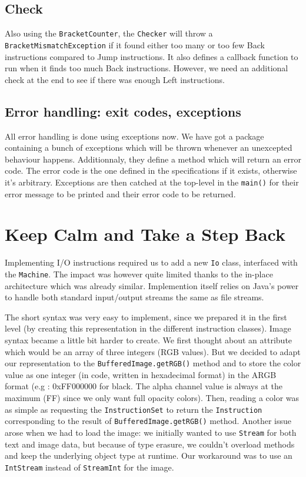 \documentclass{article}
\begin{document}
\subsection{Check}

Also using the \texttt{BracketCounter}, the \texttt{Checker} will throw a \texttt{BracketMismatchException} if it found either too many or too few Back instructions compared to Jump instructions. It also defines a callback function to run when it finds too much Back instructions. However, we need an additional check at the end to see if there was enough Left instructions.

\subsection{Error handling: exit codes, exceptions}

All error handling is done using exceptions now. We have got a package containing a bunch of exceptions which will be thrown whenever an unexcepted behaviour happens. Additionnaly, they define a method which will return an error code. The error code is the one defined in the specifications if it exists, otherwise it's arbitrary. Exceptions are then catched at the top-level in the \texttt{main()} for their error message to be printed and their error code to be returned.

\section{Keep Calm and Take a Step Back}

Implementing I/O instructions required us to add a new \texttt{Io} class, interfaced with the \texttt{Machine}. The impact was however quite limited thanks to the in-place architecture which was already similar. Implemention itself relies on Java's power to handle both standard input/output streams the same as file streams.

The short syntax was very easy to implement, since we prepared it in the first level (by creating this representation in the different instruction classes). Image syntax became a little bit harder to create. We first thought about an attribute which would be an array of three integers (RGB values). But we decided to adapt our representation to the \texttt{BufferedImage.getRGB()} method and to store the color value as one integer (in code, written in hexadecimal format) in the ARGB format (e.g : 0xFF000000 for black. The alpha channel value is always at the maximum (FF) since we only want full opacity colors). Then, reading a color was as simple as requesting the \texttt{InstructionSet} to return the \texttt{Instruction} corresponding to the result of \texttt{BufferedImage.getRGB()} method. Another issue arose when we had to load the image: we initially wanted to use \texttt{Stream} for both text and image data, but because of type erasure, we couldn't overload methods and keep the underlying object type at runtime. Our workaround was to use an \texttt{IntStream} instead of \texttt{StreamInt} for the image.
\end{document}
